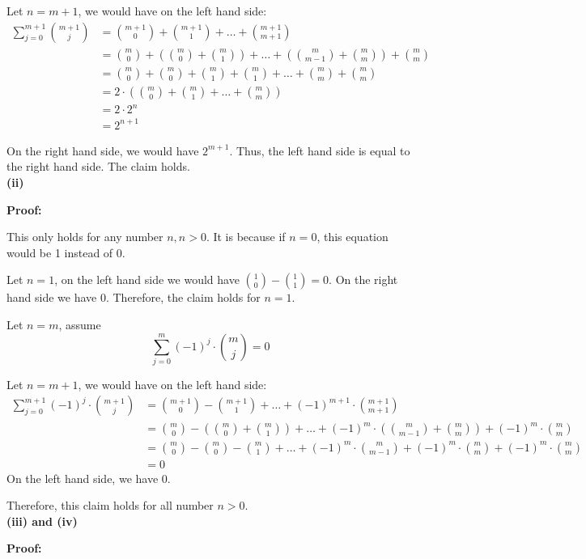 \documentclass[a4paper,12pt]{report}
\begin{document}
\noindent
Let $n=m+1$, we would have on the left hand side:
\begin{align*}
\sum_{j=0}^{m+1} \binom {m+1}j
&=\binom {m+1}0+\binom {m+1}1+\dots+\binom {m+1}{m+1}\\
&=\binom m0+\left(\binom m0+\binom m1\right)+\dots+\left(\binom m{m-1}+\binom mm\right)+\binom {m}{m}\\
&=\binom m0+\binom m0+\binom m1+\binom m1+\dots+\binom {m}{m}+\binom {m}{m}\\
&=2\cdot{\left(\binom m0+\binom m1+\dots+\binom {m}{m}\right)}\\
&=2\cdot{2^n}\\
&=2^{n+1}
\end{align*}

\noindent
On the right hand side, we would have $2^{m+1}$. Thus, the left hand side is equal to the right hand side. The claim holds. \\

\textbf{(ii)}

\noindent
\textbf{Proof: }

\noindent
This only holds for any number $n, n> 0$. It is because if $n=0$, this equation would be 1 instead of 0. 

\noindent
Let $n=1$, on the left hand side we would have \(\binom 10-\binom 11 = 0\). On the right hand side we have $0$. Therefore, the claim holds for $n=1$.

\noindent
Let $n=m$, assume $$\sum_{j=0}^{m} (-1)^j\cdot{\binom {m}j}=0$$

\noindent
Let $n=m+1$, we would have on the left hand side:
\begin{align*}
\sum_{j=0}^{m+1} (-1)^j\cdot{\binom {m+1}j} 
&= \binom {m+1}0 - \binom {m+1}1 +\dots +(-1)^{m+1}\cdot{\binom {m+1}{m+1}}\\
&= \binom {m}0 - \left(\binom {m}0+\binom {m}1\right) +\dots +(-1)^{m}\cdot{\left(\binom m{m-1}+\binom mm\right)}+(-1)^{m}\cdot{\binom mm}\\
&=\binom {m}0-\binom {m}0-\binom {m}1+\dots+(-1)^{m}\cdot{\binom m{m-1}}+(-1)^{m}\cdot{\binom mm}+(-1)^{m}\cdot{\binom mm}\\
&=0
\end{align*}
On the left hand side, we have $0$.

\noindent
Therefore, this claim holds for all number $n>0$.\\

\textbf{(iii) and (iv)}

\noindent
\textbf{Proof:}
\end{document}
